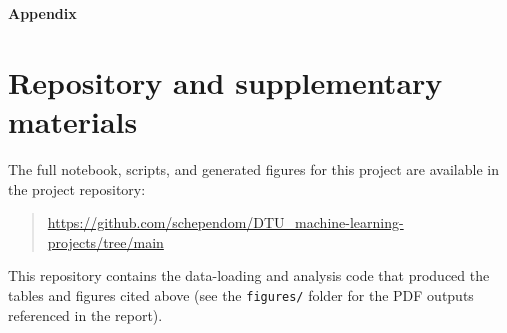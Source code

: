 \documentclass[dtu]{dtuarticle}
\begin{document}
	
	

	\vspace*{1cm}
	\appendix

	\LARGE\bfseries Appendix

	\normalsize\normalfont

	\section{Repository and supplementary materials}
	The full notebook, scripts, and generated figures for this project are available in the project repository:
	\begin{quote}
	\url{https://github.com/schependom/DTU_machine-learning-projects/tree/main}
	\end{quote}
	This repository contains the data-loading and analysis code that produced the tables and figures cited
	above (see the \texttt{figures/} folder for the PDF outputs referenced in the report).
%
%

\end{document}
